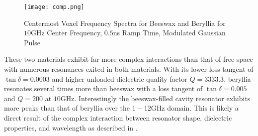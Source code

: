\begin{figure}[h!]  
	\centering
	\texttt{[image: comp.png]} 
	\caption{Centermost Voxel Frequency Spectra for Beeswax and Beryllia for $10$GHz Center Frequency, $0.5$ns Ramp Time, Modulated Gaussian Pulse}
	\label{fig:comp-spectra}
\end{figure}

These two materials exhibit far more complex interactions than that of free space with numerous resonances exited in both materials. With its lower loss tangent of $\tan\delta=0.0003$ and higher unloaded dielectric quality factor $Q=3333.3$, beryllia resonates several times more than beeswax with a loss tangent of $\tan\delta=0.005$ and $Q=200$ at $10$GHz. Interestingly the beeswax-filled cavity resonator exhibits more peaks than that of beryllia over the $1-12$GHz domain. This is likely a direct result of the complex interaction between resonator shape, dielectric properties, and wavelength as described in \cite{pozar2011microwave}. 